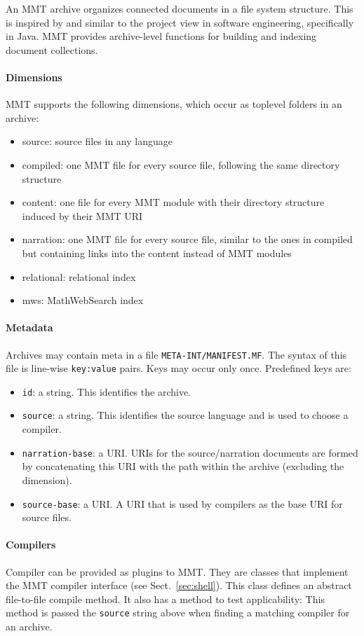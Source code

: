 An MMT archive \cite{HIJKR:dimensions:11} organizes connected documents in a file system structure. This is inspired by and similar to the project view in software engineering, specifically in Java. MMT provides archive-level functions for building and indexing document collections.

\paragraph{Dimensions}
MMT supports the following dimensions, which occur as toplevel folders in an archive:
\begin{itemize}
 \item source: source files in any language
 \item compiled: one MMT file for every source file, following the same directory structure
 \item content: one file for every MMT module with their directory structure induced by their MMT URI
 \item narration: one MMT file for every source file, similar to the ones in compiled but containing links into the content instead of MMT modules
 \item relational: relational index
 \item mws: MathWebSearch \cite{mathwebsearch} index
\end{itemize}

\paragraph{Metadata}
Archives may contain meta in a file \texttt{META-INT/MANIFEST.MF}. The syntax of this file is line-wise \texttt{key:value} pairs. Keys may occur only once.
Predefined keys are:
\begin{itemize}
 \item \texttt{id}: a string. This identifies the archive.
 \item \texttt{source}: a string. This identifies the source language and is used to choose a compiler.
 \item \texttt{narration-base}: a URI. URIs for the source/narration documents are formed by concatenating this URI with the path within the archive (excluding the dimension).
 \item \texttt{source-base}: a URI. A URI that is used by compilers as the base URI for source files.
\end{itemize}

\paragraph{Compilers}
Compiler can be provided as plugins to MMT. They are classes that implement the MMT compiler interface (see Sect.~\ref{sec:shell}). This class defines an abstract file-to-file compile method. It also has a method to test applicability: This method is passed the \texttt{source} string above when finding a matching compiler for an archive.

